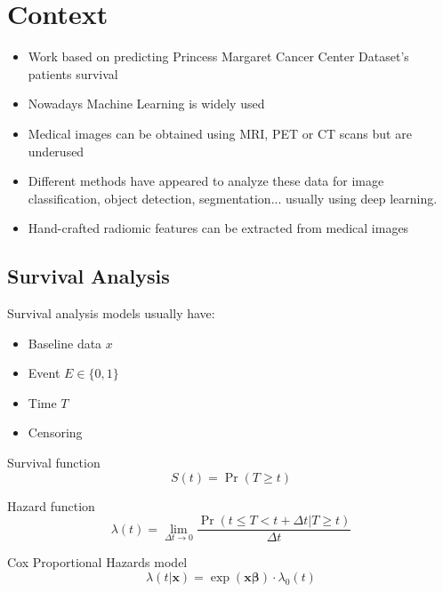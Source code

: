 
\section{Context}
\begin{frame}{\insertsec}
  \begin{itemize}
    \item Work based on predicting Princess Margaret Cancer Center Dataset's patients survival
    \item Nowadays Machine Learning is widely used
    \item Medical images can be obtained using MRI, PET or CT scans but are underused
    \item Different methods have appeared to analyze these data for image classification,
    object detection, segmentation... usually using deep learning.
    \item Hand-crafted radiomic features can be extracted from medical images
  \end{itemize}
\end{frame}

\subsection{Survival Analysis}
\begin{frame}{\insertsubsec}
  Survival analysis models usually have:
  \begin{itemize}
    \item Baseline data \( x \)
    \item Event \( E \in \{0, 1\} \)
    \item Time \( T \)
    \item Censoring
  \end{itemize}
  
  \begin{block}{Survival function}
    \[
      S(t) = \Pr(T \ge t)
    \]
  \end{block}

  \begin{block}{Hazard function}
  \[
    \lambda(t) = \lim_{\Delta t \rightarrow 0}
    \frac{\Pr(t \le T < t + \Delta t | T \ge t)}{\Delta t}
  \]
  \end{block}

  \begin{block}{Cox Proportional Hazards model}
    \[
      \lambda(t | \bm{x}) = \exp(\bm{x}\bm{\beta}) \cdot \lambda_0 (t)
    \]
  \end{block}
\end{frame}

